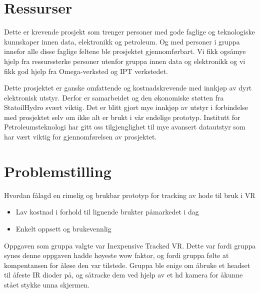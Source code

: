\section{Ressurser}

	Dette er krevende prosjekt som trenger personer med gode faglige og teknologiske kunnskaper innen data, elektronikk og petroleum. Og med personer i gruppa innefor alle disse faglige feltene ble prosjektet gjennomf\o rbart. Vi fikk ogs\aa \space mye hjelp fra ressurssterke personer utenfor gruppa innen data og elektronikk og vi fikk god hjelp fra Omega-verksted og IPT verkstedet.
	
	Dette prosjektet er ganske omfattende og kostnadskrevende med innkj\o p av dyrt elektronisk utstyr. Derfor er samarbeidet og den \o konomiske st\o tten fra StatoilHydro sv\ae rt viktig. Det er blitt gjort mye innkj\o p av utstyr i forbindelse med prosjektet selv om ikke alt er brukt i v\aa r endelige prototyp. Institutt for Petroleumsteknologi har gitt oss tilgjenglighet til mye avansert datautstyr som har v\ae rt viktig for gjennomf\o relsen av prosjektet.


\section{Problemstilling}

	Hvordan f\aa \space lagd en rimelig og brukbar prototyp for tracking av hode til bruk i VR

	\begin{itemize}
		\item Lav kostnad i forhold til lignende brukter p\aa \space markedet i dag
		\item Enkelt oppsett og brukevennlig
	\end{itemize}
	
	
Oppgaven som gruppa valgte var Inexpensive Tracked VR. Dette var fordi gruppa synes denne oppgaven hadde h\o yeste wow faktor, og fordi gruppa f\o lte at kompentansen for \aa \space l\o se den var tilstede. Gruppa ble enige om \aa \space bruke et headset til \aa \space feste IR dioder p\aa , og s\aa \space tracke dem ved hjelp av et hd kamera for \aa \space kunne st\aa \space et stykke unna skjermen.

